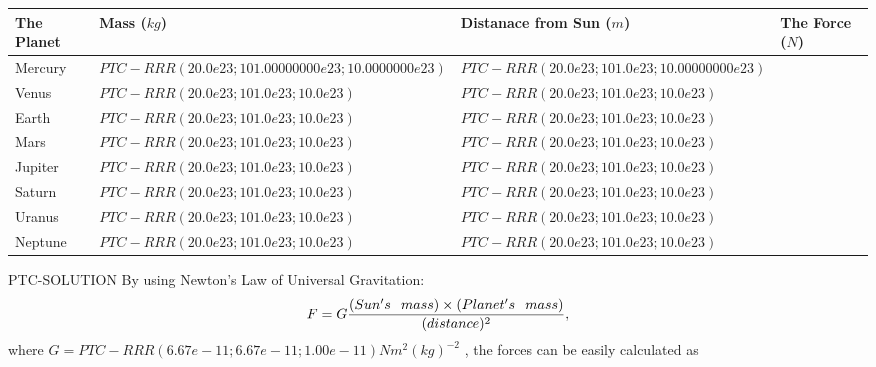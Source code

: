 \documentclass[12pt]{article}
\begin{document}
 \begin{tabular}{|l|l|l|l|}
 \hline
        The Planet & Mass ($kg$) & Distanace from Sun ($m$) & The Force ($N$)\\
 \hline
         Mercury  &
           $PTC-RRR (20.0e23; 101.00000000e23; 10.0000000e23) $   &
             $PTC-RRR (20.0e23; 101.0e23; 10.00000000e23) $    &
              \\  \hline
         Venus    &
           $PTC-RRR (20.0e23; 101.0e23; 10.0e23) $    &
             $PTC-RRR (20.0e23; 101.0e23; 10.0e23) $    &
               \\  \hline
         Earth    &
           $PTC-RRR (20.0e23; 101.0e23; 10.0e23) $    &
             $PTC-RRR (20.0e23; 101.0e23; 10.0e23) $    &
              \\   \hline
         Mars     &
           $PTC-RRR (20.0e23; 101.0e23; 10.0e23) $    &
             $PTC-RRR (20.0e23; 101.0e23; 10.0e23) $    &
               \\   \hline
         Jupiter  &
           $PTC-RRR (20.0e23; 101.0e23; 10.0e23) $    &
             $PTC-RRR (20.0e23; 101.0e23; 10.0e23) $    &
               \\  \hline
         Saturn   &
           $PTC-RRR (20.0e23; 101.0e23; 10.0e23 )$    &
             $PTC-RRR (20.0e23; 101.0e23; 10.0e23 )$    &
               \\  \hline
         Uranus   &
           $PTC-RRR (20.0e23; 101.0e23; 10.0e23) $    &
             $PTC-RRR (20.0e23; 101.0e23; 10.0e23) $    &
               \\  \hline
         Neptune  &
           $PTC-RRR (20.0e23; 101.0e23; 10.0e23) $    &
             $PTC-RRR (20.0e23; 101.0e23; 10.0e23) $    &
               \\  \hline

 \end{tabular}


PTC-SOLUTION
By using Newton's Law of Universal Gravitation:
\[
  F=G \frac{(Sun's \hspace{0.1in} mass) \times (Planet's \hspace{0.1in} mass)} { (distance)^2},
\]
where
$ G=PTC-RRR(6.67e-11; 6.67e-11; 1.00e-11)N m^{2}(kg)^{-2}$ , the forces can be easily calculated as

\vspace{0.2in}
\end{document}
